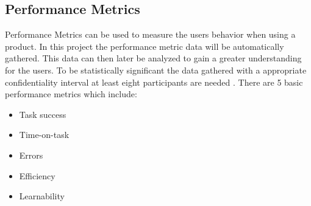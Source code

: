 \subsection{Performance Metrics}
Performance Metrics can be used to measure the users behavior when using a product. In this project the performance metric data will be automatically gathered. This data can then later be analyzed to gain a greater understanding for the users. To be statistically significant the data gathered with a appropriate confidentiality interval at least eight participants are needed \cite{tullis_albert_2011}. There are 5 basic performance metrics which include: \cite{tullis_albert_2011} \begin{itemize}
\item Task success
\item Time-on-task
\item Errors
\item Efficiency
\item Learnability
\end{itemize}

